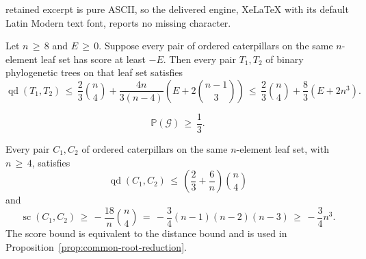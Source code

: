 \documentclass[10pt,a4paper]{amsart}
\newcommand{\qd}{\operatorname{qd}}
\newcommand{\score}{\operatorname{sc}}
\begin{document}
retained excerpt is pure ASCII, so the delivered engine, XeLaTeX with its default Latin Modern text font, reports no missing character.
\begin{proposition}
\label{prop:common-root-reduction}
Let $n\,\geq\,8$ and $E\,\geq\,0$.  Suppose every pair of ordered caterpillars on the
same $n$-element leaf set has score at least $-E$.  Then every pair
$T_1,T_2$ of binary phylogenetic trees on that leaf set satisfies
\[
 \qd(T_1,T_2)
 \,\leq\,\frac23\binom n4+
 \frac{4n}{3(n-4)}\left(E+2\binom{n-1}{3}\right)
 \,\leq\,\frac23\binom n4+\frac83(E+2n^3).
\]
\end{proposition}

\begin{equation}\label{eq:four-point-one-third}
 \mathbb P(\mathcal G)\,\geq\,\frac13.
\end{equation}

\begin{proposition}
\label{prop:elementary-caterpillar}
Every pair $C_1,C_2$ of ordered caterpillars on the same $n$-element leaf set,
with $n\,\geq\,4$, satisfies
\[
 \qd(C_1,C_2)
 \,\leq\,\left(\frac23+\frac6n\right)\binom n4
\]
and
\[
 \score(C_1,C_2)
 \,\geq\,-\frac{18}{n}\binom n4
 \,=\,-\frac34(n-1)(n-2)(n-3)
 \,\geq\,-\frac34n^3.
\]
The score bound is equivalent to the distance bound and is used in
Proposition~\ref{prop:common-root-reduction}.
\end{proposition}
\end{document}
